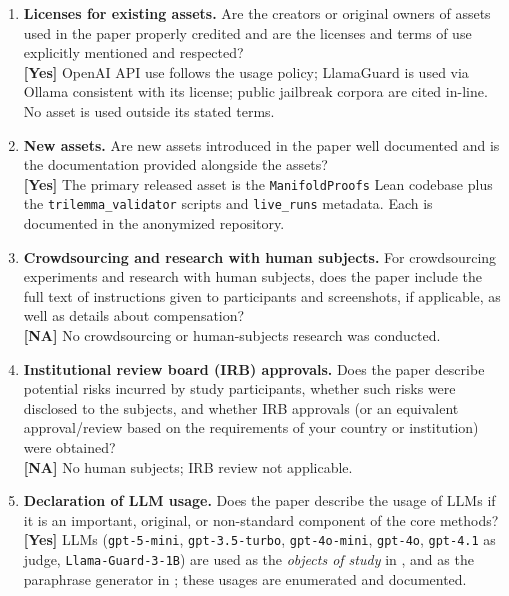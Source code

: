 \begin{enumerate}[leftmargin=1.9em,itemsep=0.25em]
\item \textbf{Licenses for existing assets.} Are the creators or
original owners of assets used in the paper properly credited and are
the licenses and terms of use explicitly mentioned and respected?
\\\textbf{[Yes]} OpenAI API use follows the usage policy; LlamaGuard
is used via Ollama consistent with its license; public jailbreak
corpora are cited in-line. No asset is used outside its stated
terms.

\item \textbf{New assets.} Are new assets introduced in the paper well
documented and is the documentation provided alongside the assets?
\\\textbf{[Yes]} The primary released asset is the
\texttt{ManifoldProofs} Lean codebase plus the
\texttt{trilemma\_validator} scripts and \texttt{live\_runs}
metadata. Each is documented in the anonymized repository.

\item \textbf{Crowdsourcing and research with human subjects.} For
crowdsourcing experiments and research with human subjects, does the
paper include the full text of instructions given to participants and
screenshots, if applicable, as well as details about compensation?
\\\textbf{[NA]} No crowdsourcing or human-subjects research was
conducted.

\item \textbf{Institutional review board (IRB) approvals.} Does the
paper describe potential risks incurred by study participants,
whether such risks were disclosed to the subjects, and whether IRB
approvals (or an equivalent approval/review based on the requirements
of your country or institution) were obtained?
\\\textbf{[NA]} No human subjects; IRB review not applicable.

\item \textbf{Declaration of LLM usage.} Does the paper describe the
usage of LLMs if it is an important, original, or non-standard
component of the core methods?
\\\textbf{[Yes]} LLMs (\texttt{gpt-5-mini},
\texttt{gpt-3.5-turbo}, \texttt{gpt-4o-mini}, \texttt{gpt-4o},
\texttt{gpt-4.1} as judge, \texttt{Llama-Guard-3-1B}) are used as
the \emph{objects of study} in
, and as the
paraphrase generator in
; these usages are
enumerated and documented.


\end{enumerate}
